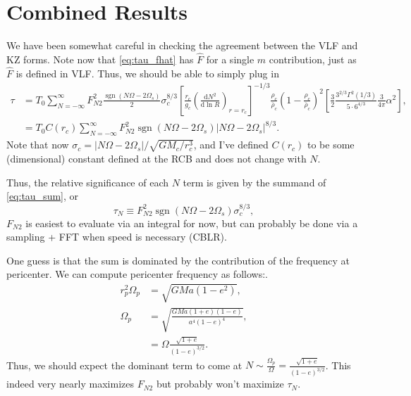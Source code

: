 \documentclass[11pt,
        usenames, %
        dvipsnames %
    ]{article}
\newcommand*{\rd}[2]{\frac{\mathrm{d}#1}{\mathrm{d}#2}}
\newcommand*{\abs}[1]{\left|#1\right|}
\newcommand*{\p}[1]{\left(#1\right)}
\newcommand*{\s}[1]{\left[#1\right]}
\DeclareMathOperator{\sgn}{sgn}
\begin{document}
\section{Combined Results}

We have been somewhat careful in checking the agreement between the VLF and KZ
forms. Note now that \autoref{eq:tau_fhat} has $\hat{F}$ for a single $m$
contribution, just as $\hat{F}$ is defined in VLF\@. Thus, we should be able to
simply plug in
\begin{align}
    \tau &= T_0 \sum\limits_{N = -\infty}^\infty
        F_{N2}^2 \frac{\sgn\p{N\Omega - 2\Omega_s}}{2} \sigma_c^{8/3}
        \s{\frac{r_c}{g_c}\p{\rd{N^2}{\ln R}}_{r = r_c}}^{-1/3}
            \frac{\rho_c}{\bar{\rho}_c} \p{1 - \frac{\rho_c}{\bar{\rho}_c}}^2
            \s{\frac{3}{2}\frac{3^{2/3}\Gamma^2(1/3)}{5 \cdot
                6^{4/3}} \frac{3}{4\pi}\alpha^2},\\
        &= T_0 C(r_c) \sum\limits_{N = -\infty}^\infty
            F_{N2}^2 \sgn\p{N\Omega - 2\Omega_s}
                \abs{N\Omega - 2\Omega_s}^{8/3}.\label{eq:tau_sum}
\end{align}
Note that now $\sigma_c = \abs{N\Omega - 2\Omega_s} / \sqrt{GM_c / r_c^3}$, and
I've defined $C(r_c)$ to be some (dimensional) constant defined at the RCB and
does not change with $N$.

Thus, the relative significance of each $N$ term is given by the summand of
\autoref{eq:tau_sum}, or
\begin{equation}
    \tau_N \equiv F_{N2}^2 \sgn\p{N\Omega - 2\Omega_s} \sigma_c^{8/3},
\end{equation}
$F_{N2}$ is easiest to evaluate via an integral for now, but can probably be
done via a sampling + FFT when speed is necessary (CBLR).

One guess is that the sum is dominated by the contribution of the frequency at
pericenter. We can compute pericenter frequency as follows:.
\begin{align}
    r_p^2 \Omega_p &= \sqrt{GMa\p{1 - e^2}},\\
    \Omega_p &= \sqrt{\frac{GMa\p{1 + e}\p{1 - e}}{a^4\p{1 - e}^4}},\\
        &= \Omega \frac{\sqrt{1 + e}}{\p{1 - e}^{3/2}}.
\end{align}
Thus, we should expect the dominant term to come at $N \sim
\frac{\Omega_p}{\Omega} = \frac{\sqrt{1 + e}}{\p{1 - e}^{3/2}}$. This indeed
very nearly maximizes $F_{N2}$ but probably won't maximize $\tau_N$.
\end{document}
